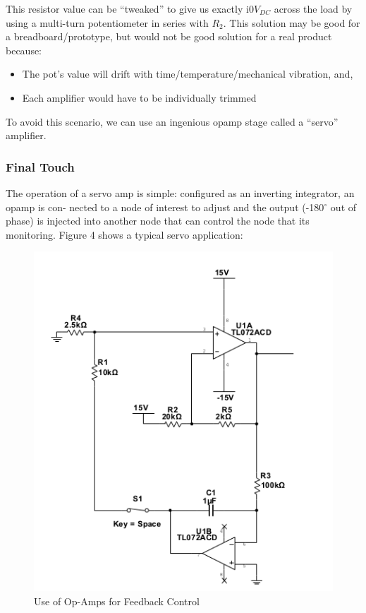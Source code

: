 \documentclass[journal]{IEEEtran}
\begin{document}
This resistor value can be “tweaked” to give us exactly i$0 V_{DC}$ across the load by using a multi-turn
potentiometer in series with $R_{2}$. This solution may be good for a breadboard/prototype, but would
not be good solution for a real product because:

\begin{itemize}
\item
The pot’s value will drift with time/temperature/mechanical vibration, and,
\item
Each amplifier would have to be individually trimmed
\end{itemize}

To avoid this scenario, we can use an ingenious opamp stage called a ``servo'' amplifier.

\subsubsection{Final Touch}

The operation of a servo amp is simple: configured as an inverting integrator, an opamp is con-
nected to a node of interest to adjust and the output (-180$^{\circ}$ out of phase) is injected into another
node that can control the node that its monitoring. Figure 4 shows a typical servo application:

\begin{figure}[H]
\centering
\includegraphics[scale=.6]{servo-app.png}
\caption{Use of Op-Amps for Feedback Control}
\label{fig_op_amp_demo}
\end{figure}
\end{document}
